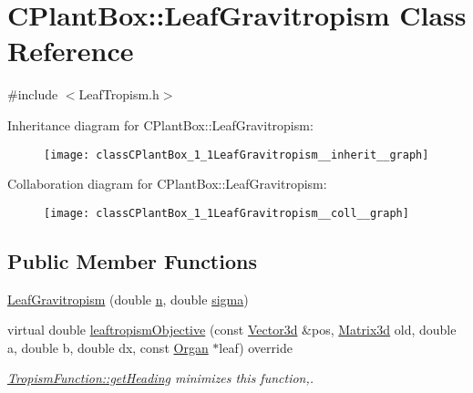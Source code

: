 \hypertarget{classCPlantBox_1_1LeafGravitropism}{}\section{C\+Plant\+Box\+:\+:Leaf\+Gravitropism Class Reference}
\label{classCPlantBox_1_1LeafGravitropism}


{\ttfamily \#include $<$Leaf\+Tropism.\+h$>$}



Inheritance diagram for C\+Plant\+Box\+:\+:Leaf\+Gravitropism\+:\nopagebreak
\begin{figure}[H]
\begin{center}
\leavevmode
\texttt{[image: classCPlantBox\_1\_1LeafGravitropism\_\_inherit\_\_graph]}
\end{center}
\end{figure}


Collaboration diagram for C\+Plant\+Box\+:\+:Leaf\+Gravitropism\+:\nopagebreak
\begin{figure}[H]
\begin{center}
\leavevmode
\texttt{[image: classCPlantBox\_1\_1LeafGravitropism\_\_coll\_\_graph]}
\end{center}
\end{figure}
\subsection*{Public Member Functions}
\begin{DoxyCompactItemize}
\item 
\hyperlink{classCPlantBox_1_1LeafGravitropism_a23f0150896076ab7a358414c9aa1d5b4}{Leaf\+Gravitropism} (double \hyperlink{classCPlantBox_1_1LeafTropismFunction_a21d8d756f8b9f6015b546def33b01c89}{n}, double \hyperlink{classCPlantBox_1_1LeafTropismFunction_a82a3dc11056a65501bc4535749c304b6}{sigma})
\item 
virtual double \hyperlink{classCPlantBox_1_1LeafGravitropism_ab0836658683f5364fef25bafc7ac610e}{leaftropism\+Objective} (const \hyperlink{classCPlantBox_1_1Vector3d}{Vector3d} \&pos, \hyperlink{classCPlantBox_1_1Matrix3d}{Matrix3d} old, double a, double b, double dx, const \hyperlink{classCPlantBox_1_1Organ}{Organ} $\ast$leaf) override
\begin{DoxyCompactList}\small\item\em \hyperlink{classCPlantBox_1_1TropismFunction_adb52b88734a94fe1365a00e02c7e6be5}{Tropism\+Function\+::get\+Heading} minimizes this function,. \end{DoxyCompactList}\end{DoxyCompactItemize}
